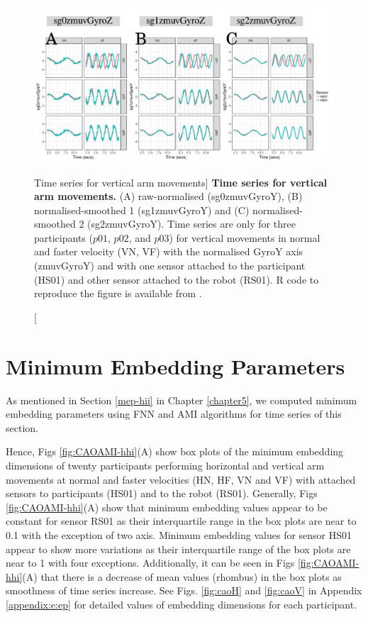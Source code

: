 \begin{figure}[!h]
  \centering
\includegraphics[width=1.0\textwidth]{fig_6_02}
	\caption
	[Time series for vertical arm movements]{
	{\bf Time series for vertical arm movements.}
		(A) raw-normalised (sg0zmuvGyroY), 
		(B) normalised-smoothed 1 (sg1zmuvGyroY) and
		(C) normalised-smoothed 2 (sg2zmuvGyroY).
		Time series are only for three participants 
		($p01$, $p02$, and $p03$) 
		for vertical movements in normal and faster velocity (VN, VF) 
		with the normalised GyroY axis (zmuvGyroY) 
		and with one sensor attached to the participant (HS01) 
		and other sensor attached to the robot (RS01).
		R code to reproduce the figure is available 
		from \cite{hwum2018}.
        }
    \label{fig:tsV}
\end{figure}

\section{Minimum Embedding Parameters}
As mentioned in Section \ref{mep-hii} in Chapter \ref{chapter5}, 
we computed minimum embedding parameters using FNN and AMI algorithms
for time series of this section.

Hence, Figs \ref{fig:CAOAMI-hhi}(A) show box plots of the minimum embedding 
dimensions of twenty participants performing horizontal and vertical arm
movements at normal and faster velocities (HN, HF, VN and VF) with 
attached sensors to participants (HS01) and to the robot (RS01).
Generally, Figs \ref{fig:CAOAMI-hhi}(A) show that minimum embedding values 
appear to be constant for sensor RS01 as their interquartile range 
in the box plots are near to 0.1 with the exception of two axis. 
Minimum embedding values for sensor HS01 appear to show more variations 
as their interquartile range of the box plots are near to 1 
with four exceptions.
Additionally, it can be seen in Figs \ref{fig:CAOAMI-hhi}(A) that there is a 
decrease of mean values (rhombus) in the box plots
as smoothness of time series increase. 
See Figs. \ref{fig:caoH} and \ref{fig:caoV} in Appendix \ref{appendix:e:ep} 
for detailed values of embedding dimensions for each participant.

